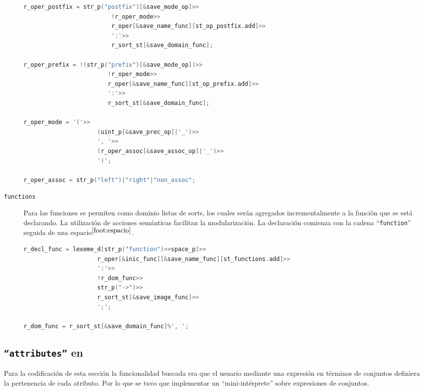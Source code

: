 \begin{description}
\begin{lstlisting}[language=C++, basicstyle=\scriptsize, columns=fullflexible, linewidth=13cm]
r_oper_postfix = str_p("postfix")[&save_mode_op]>>
                         !r_oper_mode>>
                         r_oper[&save_name_func][st_op_postfix.add]>>
                         ':'>>
                         r_sort_st[&save_domain_func];

r_oper_prefix = !(str_p("prefix")[&save_mode_op])>>
                        !r_oper_mode>>
                        r_oper[&save_name_func][st_op_prefix.add]>>
                        ':'>>
                        r_sort_st[&save_domain_func];

r_oper_mode = '('>>
                     (uint_p[&save_prec_op]|'_')>>
                     ', '>>
                     (r_oper_assoc[&save_assoc_op]|'_')>>
                     ')';

r_oper_assoc = str_p("left")|"right"|"non_assoc";
\end{lstlisting}

\item [\texttt{functions}] Para las funciones se permiten como dominio listas de sorts, los cuales serán agregados incrementalmente a la función que se está declarando. La utilización de acciones semánticas facilitan la modularización. La declaración comienza con la cadena ``\texttt{function}'' seguida de una espacio$^{\ref{foot:espacio}}$.

\begin{lstlisting}[language=C++, basicstyle=\scriptsize, columns=fullflexible, linewidth=11cm]
r_decl_func = lexeme_d[str_p("function")>>space_p]>>
                     r_oper[&inic_func][&save_name_func][st_functions.add]>>
                     ':'>>
                     !r_dom_func>>
                     str_p("->")>>
                     r_sort_st[&save_image_func]>>
                     ';';

r_dom_func = r_sort_st[&save_domain_func]%', ';
\end{lstlisting}
\end{description}

\subsection{\texttt{``attributes''} en \spirit }

Para la codificación de esta sección la funcionalidad buscada era que el usuario mediante una expresión en términos de conjuntos definiera la pertenencia de cada atributo. Por lo que se tuvo que implementar un ``mini-intérprete'' sobre expresiones de conjuntos.

